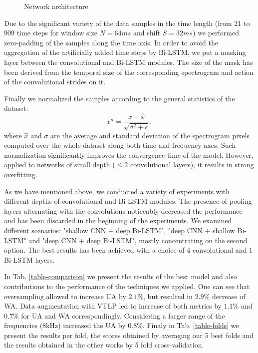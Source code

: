 \documentclass[a4paper]{article}
\newcommand{\beq}{\begin{equation}}
\newcommand{\eeq}{\end{equation}}
\begin{document}
\begin{figure*}
     \centering
     \caption{Network architecture}
     \label{fig:archi}
\end{figure*}

Due to the significant variety of the data samples in the time length (from 21 to 909 time steps for window size $N=64ms$ and shift $S=32ms$) we performed zero-padding of 
the samples along the time axis. In order to avoid the aggregation of the artificially added time steps by Bi-LSTM, we put a masking layer between the 
convolutional and Bi-LSTM modules. The size of the mask has been derived from the temporal size of the corresponding spectrogram and action of the convolutional strides on it.   

Finally we normalized the samples according to the general statistics of the dataset:
\beq
x^n = \frac{x-\hat{x}}{\sqrt{\sigma^2+\epsilon}},
\eeq
where $\hat{x}$ and $\sigma$ are the average and standard deviation of the spectrogram pixels computed over the whole dataset along both time and frequency axes. 
Such normalization significantly improves the convergence time of the model. However, applied to networks of small depth ($\leq2$ convolutional layers), 
it results in strong overfitting.

As we have mentioned above, we conducted a variety of experiments with different depths of convolutional and Bi-LSTM modules. The presence of pooling layers alternating 
with the convolutions noticeably decreased the performance and has been discarded in the beginning of the experiments. We examined different scenarios: 
"shallow CNN + deep Bi-LSTM", "deep CNN + shallow Bi-LSTM" and "deep CNN + deep Bi-LSTM", mostly concentrating on the second option. The best results has been achieved with a choice of 4 convolutional and 1 Bi-LSTM layers. 

In Tab. \ref{table-comparison} we present the results of the best model and also contributions to the performance of the techniques we applied. One can see that 
oversampling allowed to increase UA by $2.1\%$, but resulted in $2.9\%$ decrease of WA. Data augmentation with VTLP led to increase of both metrics by $1.1\%$ and $0.7\%$ 
for UA and WA correspondingly. Considering a larger range of the frequencies (8kHz) increased the UA by $0.8\%$. Finaly in Tab. \ref{table-folds} we present the results per fold, the scores obtained by averaging our 5 best folds and the results obtained in the other works by 5 fold cross-validation.
\end{document}
